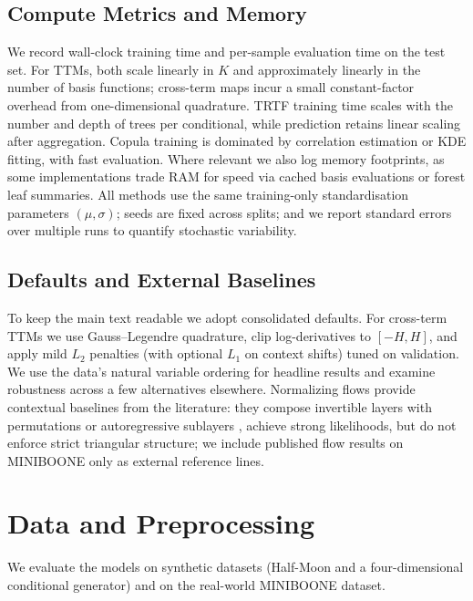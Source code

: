 \documentclass[11pt,a4paper,twoside]{book}\usepackage[]{graphicx}\usepackage[]{xcolor}
\begin{document}
\subsection{Compute Metrics and Memory}

We record wall-clock training time and per-sample evaluation time on the test set. For TTMs, both scale linearly in $K$ and approximately linearly in the number of basis functions; cross-term maps incur a small constant-factor overhead from one-dimensional quadrature. TRTF training time scales with the number and depth of trees per conditional, while prediction retains linear scaling after aggregation. Copula training is dominated by correlation estimation or KDE fitting, with fast evaluation. Where relevant we also log memory footprints, as some implementations trade RAM for speed via cached basis evaluations or forest leaf summaries. All methods use the same training-only standardisation parameters $(\mu,\sigma)$; seeds are fixed across splits; and we report standard errors over multiple runs to quantify stochastic variability.

\subsection{Defaults and External Baselines}

To keep the main text readable we adopt consolidated defaults. For cross-term TTMs we use Gauss--Legendre quadrature, clip log-derivatives to $[-H,H]$, and apply mild $L_2$ penalties (with optional $L_1$ on context shifts) tuned on validation. We use the data's natural variable ordering for headline results and examine robustness across a few alternatives elsewhere. Normalizing flows provide contextual baselines from the literature: they compose invertible layers with permutations or autoregressive sublayers \citep{rezende2015variational,dinh2017real,papamakarios2021normalizing}, achieve strong likelihoods, but do not enforce strict triangular structure; we include published flow results on MINIBOONE only as external reference lines.

\section{Data and Preprocessing}

We evaluate the models on synthetic datasets (Half-Moon and a four-dimensional conditional generator) and on the real-world MINIBOONE dataset.
\end{document}
